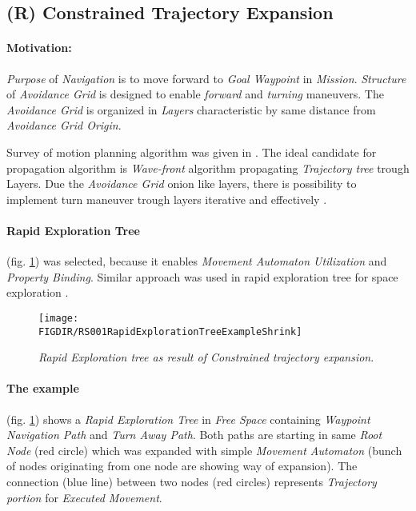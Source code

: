 \subsection{(R) Constrained Trajectory Expansion}\label{s:constrainedTrajectoryExpansion}

\paragraph{Motivation:} \emph{Purpose} of \emph{Navigation} is to move forward to \emph{Goal Waypoint} in \emph{Mission}. \emph{Structure} of \emph{Avoidance Grid} is designed to enable \emph{forward} and \emph{turning} maneuvers. The \emph{Avoidance Grid} is organized in \emph{Layers} characteristic by same distance from \emph{Avoidance Grid Origin}. 

Survey of motion planning algorithm was given in \cite{goerzen2009survey}. The ideal candidate for propagation algorithm is \emph{Wave-front} algorithm propagating \emph{Trajectory tree} trough Layers. Due the \emph{Avoidance Grid} onion like layers, there is possibility to implement turn maneuver trough layers iterative and effectively .

\paragraph{Rapid Exploration Tree} (fig. \ref{fig:rapidExplorationTrajectoryTree}) was selected, because it enables \emph{Movement Automaton Utilization} and \emph{Property Binding}. Similar approach was used in rapid exploration tree  for space exploration \cite{plaisant2002spacetree}. 

\begin{figure}[H]
    \centering
    \texttt{[image: \\FIGDIR/RS001RapidExplorationTreeExampleShrink]} 
    \caption{\emph{Rapid Exploration tree as result of \emph{Constrained trajectory expansion}}.}
    \label{fig:rapidExplorationTrajectoryTree}
\end{figure}

\paragraph{The example} (fig. \ref{fig:rapidExplorationTrajectoryTree}) shows a \emph{Rapid Exploration Tree} in \emph{Free Space} containing \emph{Waypoint Navigation Path} and \emph{Turn Away Path}. Both paths are starting in same \emph{Root Node} (red circle) which was expanded with simple \emph{Movement Automaton} (bunch of nodes originating from one node are showing way of expansion). The connection (blue line) between two nodes (red circles) represents \emph{Trajectory portion} for \emph{Executed Movement}.

